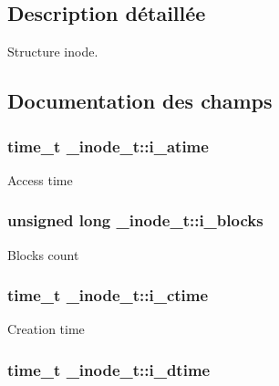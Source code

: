 \subsection{\-Description détaillée}
\-Structure inode. 

\subsection{\-Documentation des champs}
\hypertarget{struct__inode__t_a01f50c6c44a3b50e4414a794643b741f}{
\subsubsection[{i\-\_\-atime}]{\setlength{\rightskip}{0pt plus 5cm}time\-\_\-t {\bf \-\_\-inode\-\_\-t\-::i\-\_\-atime}}}\label{struct__inode__t_a01f50c6c44a3b50e4414a794643b741f}
\-Access time \hypertarget{struct__inode__t_a92ebe4c1e93af9fba4efae4d07e14858}{
\subsubsection[{i\-\_\-blocks}]{\setlength{\rightskip}{0pt plus 5cm}unsigned long {\bf \-\_\-inode\-\_\-t\-::i\-\_\-blocks}}}\label{struct__inode__t_a92ebe4c1e93af9fba4efae4d07e14858}
\-Blocks count \hypertarget{struct__inode__t_a73ee1e604547b74b8e1045fd4f6699b6}{
\subsubsection[{i\-\_\-ctime}]{\setlength{\rightskip}{0pt plus 5cm}time\-\_\-t {\bf \-\_\-inode\-\_\-t\-::i\-\_\-ctime}}}\label{struct__inode__t_a73ee1e604547b74b8e1045fd4f6699b6}
\-Creation time \hypertarget{struct__inode__t_a393de4c58241168fdf397ab8421a3539}{
\subsubsection[{i\-\_\-dtime}]{\setlength{\rightskip}{0pt plus 5cm}time\-\_\-t {\bf \-\_\-inode\-\_\-t\-::i\-\_\-dtime}}}\label{struct__inode__t_a393de4c58241168fdf397ab8421a3539}
